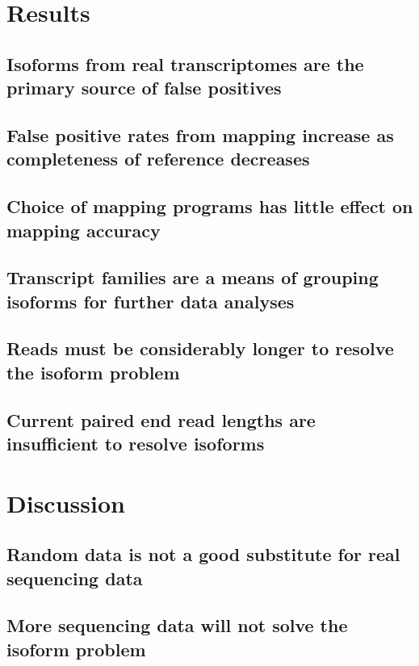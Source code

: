 \documentclass[10pt]{article}
\begin{document}
\section*{Results}

\subsection*{Isoforms from real transcriptomes are the primary source of false positives}

\subsection*{False positive rates from mapping increase as completeness of reference decreases}

\subsection*{Choice of mapping programs has little effect on mapping accuracy}

\subsection*{Transcript families are a means of grouping isoforms for further data analyses}

\subsection*{Reads must be considerably longer to resolve the isoform problem}

\subsection*{Current paired end read lengths are insufficient to resolve isoforms}

\section*{Discussion}

\subsection*{Random data is not a good substitute for real sequencing data}

\subsection*{More sequencing data will not solve the isoform problem}
\end{document}
